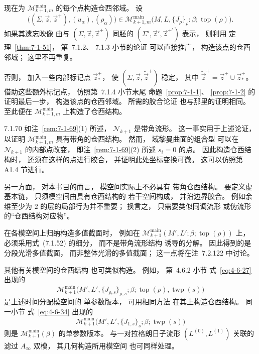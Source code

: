 现在为
$\mathcal M^{\mathrm{main}}_{k+1,m}$
的每个点构造仓西邻域。
设
\[
\bigl(
(\Sigma,\vec z,\vec z^+),
(u_\alpha),(\rho_\alpha)
\bigr)
\in
\mathcal M^{\mathrm{main}}_{k+1,m}
\bigl(
M,L,\{J_\rho\}_\rho:\beta;\operatorname{top}(\rho)
\bigr).
\]
如果其遗忘映像
由与
$(\Sigma,\vec z,\vec z^+)$
同胚的
$(\Sigma',\vec z',\vec z^{+\prime})$
表示，
则利用
定理~\ref{thm:7-1-51}，
第~7.1.2、
7.1.3 小节的论证
可以直接推广，
构造该点的仓西邻域；
这里不再重复。

否则，
加入一些内部标记点
$\vec z_*^+$，
使
$(\Sigma,\vec z,\widetilde{\vec z}^{+})$
稳定，
其中
$\widetilde{\vec z}^{+}
=\vec z^+\cup\vec z_*^+$。
借助这些额外标记点，
仿照第~7.1.4 小节末尾
命题~\ref{prop:7-1-1}、
\ref{prop:7-1-2}
的证明最后一步，
构造该点的仓西邻域。
所需的胶合论证
也与那里的证明相同。
至此便在
$\mathcal M^{\mathrm{main}}_{k+1,m}$
上构造了仓西结构。

\begin{remark}{7.1.70}\label{rem:7-1-70}
如注~\ref{rem:7-1-69}\textup{(1)}
所述，
$\mathcal N_{k+1}$
是带角流形。
这一事实用于上述论证，
以证明
$\mathcal M^{\mathrm{main}}_{k+1,m}$
具有带角的仓西结构。
然而，
域黎曼曲面的组合型
可以在
$\mathcal N_{k+1}$
的内部点改变，
即注~\ref{rem:7-1-69}\textup{(2)}
所述 $s_i=0$ 的点。
因此构造仓西结构时，
还须在这样的点进行胶合，
并证明此处坐标变换可微。
这可以仿照第 A1.4 节进行。

另一方面，
对本书目的而言，
模空间实际上不必具有
带角仓西结构。
要定义虚基本链，
只须模空间由具有仓西结构的
若干空间构成，
并沿边界胶合。
例如余维至少为 $2$
的层的局部行为并不重要；
换言之，
只需要类似同调流形
或伪流形的“仓西结构对应物”。

在各模空间上归纳构造多值截面时，
例如在
$\mathcal M^{\mathrm{main}}_{k+1}
(M',L';\beta;\operatorname{top}(\rho))$
上，
必须采用式~(7.1.52)
的细分，
而不是带角流形结构
诱导的分解。
因此得到的是
分段光滑多值截面，
而非整体光滑的多值截面；
这一点将在注~7.2.122 中讨论。

其他有关模空间的仓西结构
也可类似构造。
例如，
第~4.6.2 小节
式~\eqref{eq:4-6-27}
出现的
\[
\mathcal M^{\mathrm{main}}_{k+1}
\bigl(
M',L',\{J_{\rho,s}\}_{\rho,s};
\beta;\operatorname{top}(\rho),
\operatorname{twp}(s)
\bigr)
\]
是上述时间分配模空间的
单参数版本，
可用相同方法
在其上构造仓西结构。
同一小节
式~\eqref{eq:4-6-34}
出现的
\[
\mathcal M^{\mathrm{main}}_{k+1}
\bigl(
M',L',\{J_{1,s}\}_s;
\beta;\operatorname{twp}(s)
\bigr)
\]
则是
$\mathcal M^{\mathrm{main}}_{k+1}(\beta)$
的单参数版本。
与一对拉格朗日子流形
$(L^{(0)},L^{(1)})$
关联的滤过 $A_\infty$ 双模，
其几何构造所用模空间
也可同样处理。
\end{remark}
